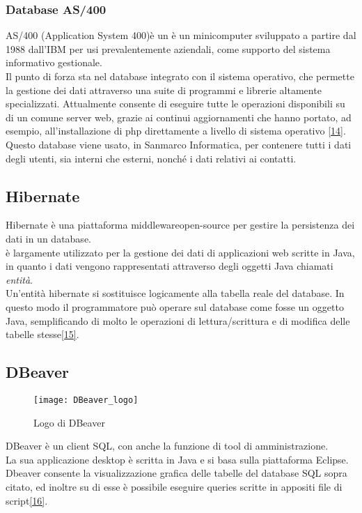 \subsubsection{Database AS/400}
AS/400 (Application System 400)è un è un minicomputer sviluppato a partire dal 1988 dall’IBM per usi prevalentemente aziendali, come supporto del sistema informativo gestionale.\\
Il punto di forza sta nel database integrato con il sistema operativo, che permette la gestione dei dati attraverso una suite di programmi e librerie altamente specializzati. Attualmente consente di eseguire tutte le operazioni disponibili su di un comune server web, grazie ai continui aggiornamenti che hanno portato, ad esempio, all'installazione di \gls{php} direttamente a livello di sistema operativo \hyperlink{14}{[14]}.
Questo database viene usato, in Sanmarco Informatica, per contenere tutti i dati degli utenti, sia interni che esterni, nonché i dati relativi ai contatti. %
\subsection{Hibernate}
Hibernate è una piattaforma \gls{middleware}\glsfirstoccur open-source per gestire la persistenza dei dati in un database.\\
è largamente utilizzato per la gestione dei dati di applicazioni web scritte in Java, in quanto i dati vengono rappresentati attraverso degli oggetti Java chiamati \emph{entità}.\\
Un'entità hibernate si sostituisce logicamente alla tabella reale del database. In questo modo il programmatore può operare sul database come fosse un oggetto Java, semplificando di molto le operazioni di lettura/scrittura e di modifica delle tabelle stesse\hyperlink{15}{[15]}.\\

\newpage

\subsection{DBeaver}

\begin{figure}[h]
	\centering
	\texttt{[image: DBeaver\_logo]}
	\caption{Logo di DBeaver}
\end{figure}
DBeaver è un client SQL, con anche la funzione di tool di amministrazione.\\
La sua applicazione desktop è scritta in Java e si basa sulla piattaforma Eclipse.\\
Dbeaver consente la visualizzazione grafica delle tabelle del database SQL sopra citato, ed inoltre su di esse è possibile eseguire queries scritte in appositi file di script\hyperlink{16}{[16]}.\\
